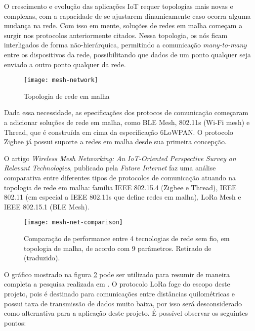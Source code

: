\documentclass[../monografia.tex]{subfiles}
\begin{document}
O crescimento e evolução das aplicações IoT requer topologias mais novas e complexas, com a capacidade de se ajustarem dinamicamente caso ocorra alguma mudança na rede. Com isso em mente, soluções de redes em malha começam a surgir nos protocolos anteriormente citados. Nessa topologia, os nós ficam interligados de forma não-hierárquica, permitindo a comunicação \textit{many-to-many} entre os dispositivos da rede, possibilitando que dados de um ponto qualquer seja enviado a outro ponto qualquer da rede. 


\begin{figure}[h!]
\centering
	\texttt{[image: mesh-network]}
	\caption{Topologia de rede em malha}
	\label{fig:Rede em malha}
\end{figure}

Dada essa necessidade, as epecificações dos protocos de comunicação começaram a adicionar soluções de rede em malha, como BLE Mesh, 802.11s (Wi-Fi mesh) e Thread, que é construída em cima da especificação 6LoWPAN. O protocolo Zigbee já possui suporte a redes em malha desde sua primeira concepção.

O artigo \textit{Wireless Mesh Networking: An IoT-Oriented Perspective Survey on Relevant Technologies}, publicado pela \textit{Future Internet}\cite{mesh-net-comparison} faz uma análise comparativa entre diferentes tipos de protocolos de comunicação atuando na topologia de rede em malha: família IEEE 802.15.4 (Zigbee e Thread), IEEE 802.11 (em especial a IEEE 802.11s que define redes em malha), LoRa Mesh e IEEE 802.15.1 (BLE Mesh).

\begin{figure}[h!]
\centering
	\texttt{[image: mesh-net-comparison]}
	\caption{
		Comparação de performance entre 4 tecnologias de rede sem fio, em topologia de malha, de acordo com 9 parâmetros. Retirado de \cite{mesh-net-comparison} (traduzido).
	}
	\label{fig:Comparação redes mesh}
\end{figure}

O gráfico mostrado na figura \ref{fig:Comparação redes mesh}  pode ser utilizado para resumir de maneira completa a pesquisa realizada em \cite{mesh-net-comparison}. O protocolo LoRa foge do escopo deste projeto, pois é destinado para comunicações entre distâncias quilométricas e possui taxa de transmissão de dados muito baixa, por isso será desconsiderado como alternativa para a aplicação deste projeto. É possível observar os seguintes pontos:
\end{document}
